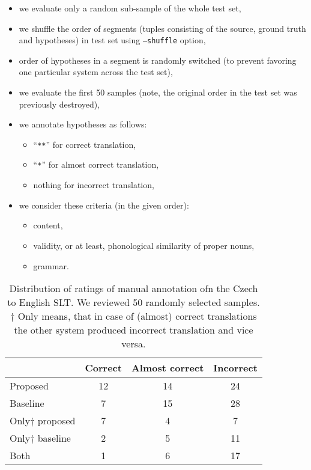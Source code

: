 \begin{itemize}
	\item we evaluate only a random sub-sample of the whole test set,
	\item we shuffle the order of segments (tuples consisting of the source, ground truth and hypotheses) in test set using \texttt{--shuffle} option,
	\item order of hypotheses in a segment is randomly switched (to prevent favoring one particular system across the test set),
	\item we evaluate the first 50 samples (note, the original order in the test set was previously destroyed), 
	\item we annotate hypotheses as follows:
	\begin{itemize}
		\item ``\texttt{**}'' for correct translation,
		\item ``\texttt{*}'' for almost correct translation,
		\item nothing for incorrect translation,
	\end{itemize}
	\item we consider these criteria (in the given order):
	\begin{itemize}
		\item content,
		\item validity, or at least, phonological similarity of proper nouns,
		\item grammar.
	\end{itemize}
\end{itemize}

\begin{table}[t]
	\centering
	\begin{tabular}{l|ccc}
		& Correct & Almost correct & Incorrect \\ \hline
		Proposed      & 12      & 14             & 24        \\
		Baseline      & 7       & 15             & 28        \\ \hline
		Only$\dagger$ proposed & 7       & 4              & 7         \\
		Only$\dagger$ baseline & 2       & 5              & 11        \\ \hline
		Both          & 1       & 6              & 17       
	\end{tabular}	
	\caption[Czech to English manual evaluation]{Distribution of ratings of manual annotation ofn the Czech to English SLT. We reviewed 50 randomly selected samples.\\$\dagger$ Only means, that in case of (almost) correct translations the other system produced incorrect translation and vice versa.}
	\label{tab:manual_cs_en}
\end{table}

